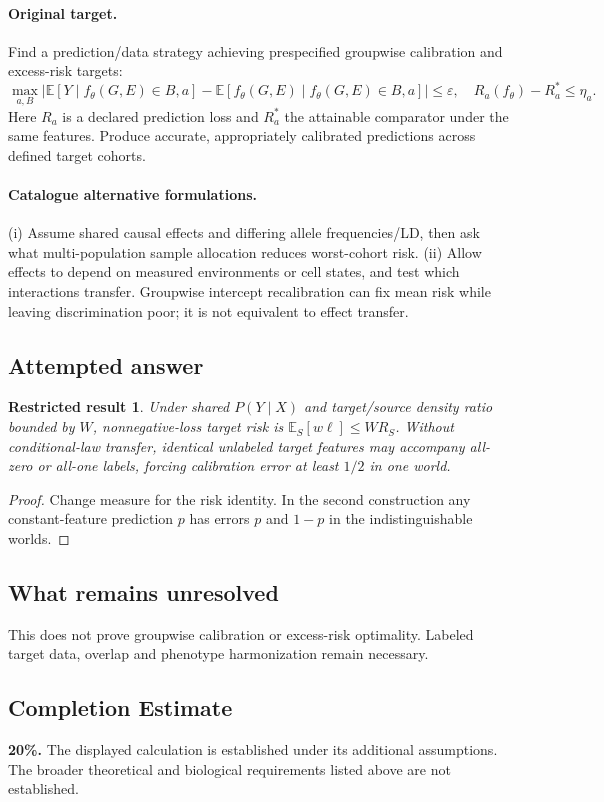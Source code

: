 \documentclass[11pt]{article}
\newcommand{\E}{\mathbb E}
\providecommand{\E}{\mathbb E}
\newtheorem{attemptresult}{Restricted result}[section]
\begin{document}
\paragraph{Original target.}
Find a prediction/data strategy achieving prespecified groupwise calibration and excess-risk targets:
\[
\max_{a,B}|\E[Y\mid f_\theta(G,E)\in B,a]-\E[f_\theta(G,E)\mid f_\theta(G,E)\in B,a]|\leq\varepsilon,
\quad R_a(f_\theta)-R_a^*\leq\eta_a.
\]
Here $R_a$ is a declared prediction loss and $R_a^*$ the attainable comparator under the same features. Produce accurate, appropriately calibrated predictions across defined target cohorts.
\paragraph{Catalogue alternative formulations.}
(i) Assume shared causal effects and differing allele frequencies/LD, then ask what multi-population sample allocation reduces worst-cohort risk. (ii) Allow effects to depend on measured environments or cell states, and test which interactions transfer. Groupwise intercept recalibration can fix mean risk while leaving discrimination poor; it is not equivalent to effect transfer.
\subsection{Attempted answer}
\begin{attemptresult}
Under shared $P(Y\mid X)$ and target/source density ratio bounded by $W$, nonnegative-loss target risk is $\E_S[w\ell]\leq WR_S$. Without conditional-law transfer, identical unlabeled target features may accompany all-zero or all-one labels, forcing calibration error at least $1/2$ in one world.
\end{attemptresult}
\begin{proof}
Change measure for the risk identity. In the second construction any constant-feature prediction $p$ has errors $p$ and $1-p$ in the indistinguishable worlds.
\end{proof}
\subsection{What remains unresolved}
This does not prove groupwise calibration or excess-risk optimality. Labeled target data, overlap and phenotype harmonization remain necessary.
\subsection{Completion Estimate}
\textbf{20\%.} The displayed calculation is established under its additional assumptions. The broader theoretical and biological requirements listed above are not established.
\end{document}
